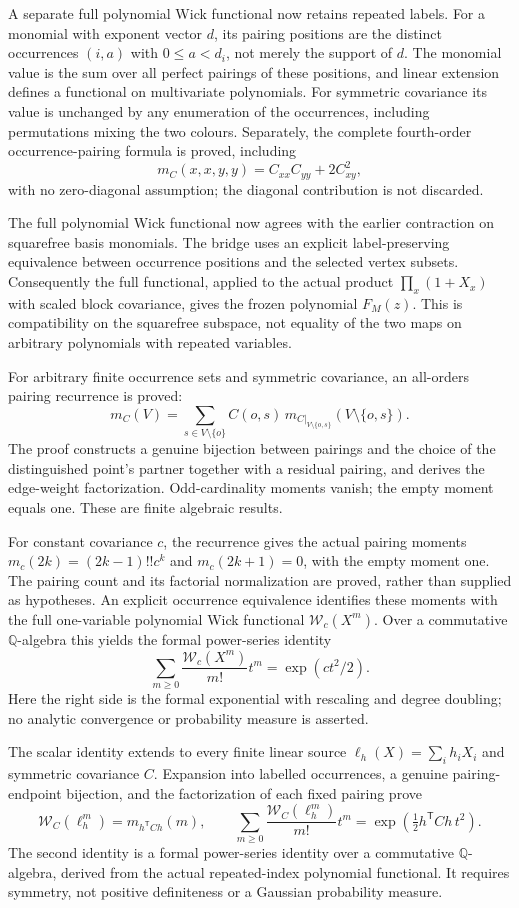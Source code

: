 \documentclass[11pt]{article}
\begin{document}
A separate full polynomial Wick functional now retains repeated labels. For a monomial with exponent vector $d$, its pairing positions are the distinct occurrences $(i,a)$ with $0\le a<d_i$, not merely the support of $d$. The monomial value is the sum over all perfect pairings of these positions, and linear extension defines a functional on multivariate polynomials. For symmetric covariance its value is unchanged by any enumeration of the occurrences, including permutations mixing the two colours. Separately, the complete fourth-order occurrence-pairing formula is proved, including
\[
 m_C(x,x,y,y)=C_{xx}C_{yy}+2C_{xy}^2,
\]
with no zero-diagonal assumption; the diagonal contribution is not discarded.

The full polynomial Wick functional now agrees with the earlier contraction on squarefree basis monomials. The bridge uses an explicit label-preserving equivalence between occurrence positions and the selected vertex subsets. Consequently the full functional, applied to the actual product $\prod_x(1+X_x)$ with scaled block covariance, gives the frozen polynomial $F_M(z)$. This is compatibility on the squarefree subspace, not equality of the two maps on arbitrary polynomials with repeated variables.

For arbitrary finite occurrence sets and symmetric covariance, an all-orders pairing recurrence is proved:
\[
 m_C(V)=\sum_{s\in V\setminus\{o\}} C(o,s)\,
 m_{C|_{V\setminus\{o,s\}}}(V\setminus\{o,s\}).
\]
The proof constructs a genuine bijection between pairings and the choice of the distinguished point's partner together with a residual pairing, and derives the edge-weight factorization. Odd-cardinality moments vanish; the empty moment equals one. These are finite algebraic results. 

For constant covariance $c$, the recurrence gives the actual pairing moments $m_c(2k)=(2k-1)!!c^k$ and $m_c(2k+1)=0$, with the empty moment one. The pairing count and its factorial normalization are proved, rather than supplied as hypotheses. An explicit occurrence equivalence identifies these moments with the full one-variable polynomial Wick functional $\mathcal W_c(X^m)$. Over a commutative $\mathbb Q$-algebra this yields the formal power-series identity
\[
 \sum_{m\ge0}\frac{\mathcal W_c(X^m)}{m!}t^m
 =\exp(ct^2/2).
\]
Here the right side is the formal exponential with rescaling and degree doubling; no analytic convergence or probability measure is asserted. 

The scalar identity extends to every finite linear source $\ell_h(X)=\sum_i h_iX_i$ and symmetric covariance $C$. Expansion into labelled occurrences, a genuine pairing-endpoint bijection, and the factorization of each fixed pairing prove
\[
 \mathcal W_C(\ell_h^m)=m_{h^{\mathsf T}Ch}(m),\qquad
 \sum_{m\ge0}\frac{\mathcal W_C(\ell_h^m)}{m!}t^m
 =\exp\!\left(\tfrac12 h^{\mathsf T}Ch\,t^2\right).
\]
The second identity is a formal power-series identity over a commutative $\mathbb Q$-algebra, derived from the actual repeated-index polynomial functional. It requires symmetry, not positive definiteness or a Gaussian probability measure. 
\end{document}
